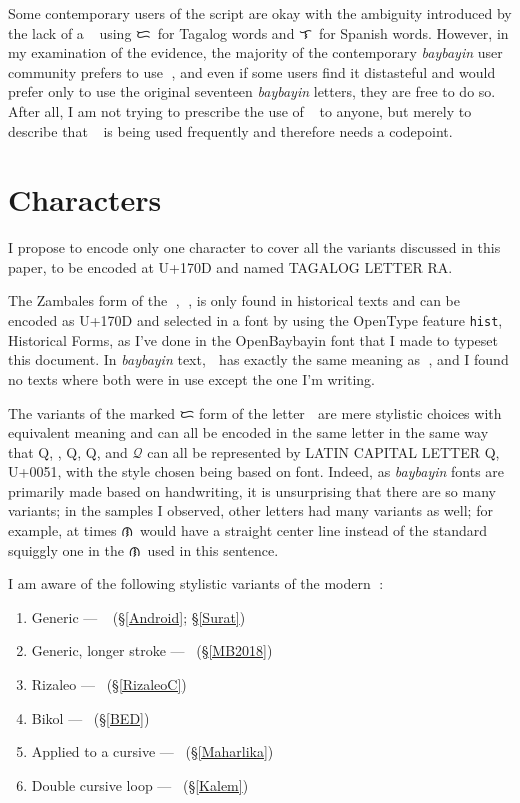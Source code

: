 \documentclass[a4paper,pagesize,openany,14pt,parskip=never]{scrbook}
\newcommand{\≈}{$\approx$}
\newcommand{\la}{{\baybayin ᜎ}}
\newcommand{\da}{{\baybayin ᜇ}}
\newcommand{\ra}{{\baybayin ᜍ}}
\newcommand{\na}{{\baybayin ᜈ}}
\newcommand{\rizaleoRA}{{\baybayinb \symbol{"E005}}}
\newcommand{\cochinQ}{{\cochin Q}}
\begin{document}
Some contemporary users of the script are okay with the ambiguity introduced by the lack of a \ra\, using \da\ for Tagalog words and \la\ for Spanish words. However, in my examination of the evidence, the majority of the contemporary {\em baybayin} user community prefers to use \ra, and even if some users find it distasteful and would prefer only to use the original seventeen {\em baybayin} letters, they are free to do so. After all, I am not trying to prescribe the use of \ra\ to anyone, but merely to describe that \ra\ is being used frequently and therefore needs a codepoint.

\section{Characters}
I propose to encode only one character to cover all the variants discussed in this paper, to be encoded at U+170D and named \textsf{TAGALOG LETTER RA}. 

The Zambales form of the {\baybayin ᜍ}, {\baybayinh ᜍ}, is only found in historical texts and can be encoded as U+170D and selected in a font by using the OpenType feature \texttt{hist}, \textsf{Historical Forms}, as I've done in the OpenBaybayin font that I made to typeset this document. In {\em baybayin} text, {\baybayinh ᜍ} has exactly the same meaning as {\baybayin ᜍ}, and I found no texts where both were in use except the one I'm writing.

The variants of the marked {\baybayin ᜇ} form of the letter {\baybayin ᜍ} are mere stylistic choices with equivalent meaning and can all be encoded in the same letter in the same way that Q, {}, \textsf{Q}, \cochinQ, and $\mathscr{Q}$ can all be represented by \textsf{LATIN CAPITAL LETTER Q}, U+0051, with the style chosen being based on font. Indeed, as {\em baybayin} fonts are primarily made based on handwriting, it is unsurprising that there are so many variants; in the samples I observed, other letters had many variants as well; for example, at times \na\ would have a straight center line instead of the standard squiggly one in the \na\ used in this sentence.

I am aware of the following stylistic variants of the modern \ra:

\begin{enumerate}
    \item Generic --- \ra\ (\S\ref{Android}; \S\ref{Surat})
    \item Generic, longer stroke --- {\baybayinb {}}\ (\S\ref{MB2018})
    \item Rizaleo --- \rizaleoRA\ (\S\ref{RizaleoC})
    \item Bikol --- {\baybayinb {}}\ (\S\ref{BED})
    \item Applied to a cursive {\baybayinb {}} --- {\baybayinb {}}\ (\S\ref{Maharlika})
    \item\label{DoubleLoop} Double cursive loop --- {\baybayinb {}}\ (\S\ref{Kalem})
\end{enumerate}
\end{document}
